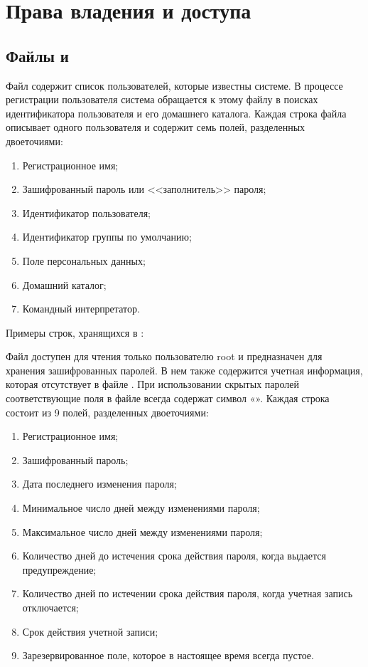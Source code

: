 \section{Права владения и доступа}

\subsection{Файлы  и }

Файл  содержит список пользователей, которые известны системе. В процессе регистрации пользователя система обращается к этому файлу в поисках идентификатора пользователя и его домашнего каталога. Каждая строка файла описывает одного пользователя и  содержит семь полей, разделенных двоеточиями:
\begin{enumerate}
	\item Регистрационное имя;
	\item Зашифрованный пароль или <<заполнитель>> пароля;
	\item Идентификатор пользователя;
	\item Идентификатор группы по умолчанию;
	\item Поле персональных данных;
	\item Домашний каталог;
	\item Командный интерпретатор.
\end{enumerate}

Примеры строк, хранящихся в :


Файл  доступен для чтения только пользователю root и предназначен для хранения зашифрованных паролей. В нем также содержится учетная информация, которая отсутствует в файле . При использовании скрытых паролей соответствующие поля в файле  всегда содержат символ «». Каждая строка состоит из 9 полей, разделенных двоеточиями:
\begin{enumerate}
	\item Регистрационное имя;
	\item Зашифрованный пароль;
	\item Дата последнего изменения пароля;
	\item Минимальное число дней между изменениями пароля;
	\item Максимальное число дней между изменениями пароля;
	\item Количество дней до истечения срока действия пароля, когда выдается предупреждение;
	\item Количество дней по истечении срока действия пароля, когда учетная запись отключается;
	\item Срок действия учетной записи;
	\item Зарезервированное поле, которое в настоящее время всегда пустое.
\end{enumerate}

